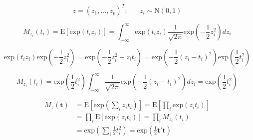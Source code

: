 \documentclass[12pt]{article}
\begin{document}
        \begin{equation}
            z = (z_1,...,z_p)^T; \hspace{20pt} z_i \sim \text{N}(0,1)
        \end{equation}

        \begin{equation}
            M_{z_i}(t_i) = \text{E}[\text{exp}(t_i z_i)] = \int_{-\infty}^\infty \text{exp}(t_i z_i) \frac{1}{\sqrt{2 \pi}} \text{exp}\left( -\frac{1}{2} z_i^2 \right) dz_i
        \end{equation}

        \begin{equation}
            \text{exp}(t_i z_i) \text{exp}\left( -\frac{1}{2} z_i^2 \right) = \text{exp}\left( -\frac{1}{2} z_i^2 + z_i t_i\right) = \text{exp}\left( -\frac{1}{2}(z_i - t_i)^2 \right) \text{exp} \left (\frac{1}{2} t_i^2 \right)
        \end{equation}

        \begin{equation}
            M_{z_i}(t_i) = \text{exp}\left( \frac{1}{2} t_i^2\right) \int_{-\infty}^{\infty} \frac{1}{\sqrt{2\pi}} \text{exp}\left( - \frac{1}{2} (z_i - t_i)^2\right) dz_i = \text{exp}\left( \frac{1}{2}t_i^2 \right )
        \end{equation}

        \begin{align}
            M_z(\mathbf{t}) &= \text{E}\left[\text{exp}\left(\sum_i z_i t_i\right)\right] = \text{E}\left[ \prod_i \text{exp}(z_i t_i)\right]\\
            &= \prod_i \text{E}[\text{exp}(z_i t_i)] = \prod_i M_{z_i}(t_i)\\
            &= \text{exp}\left( \sum_i \frac{1}{2} t_i^2 \right) = \text{exp}\left ( \frac{1}{2} \mathbf{t't}\right)
        \end{align}
\end{document}
